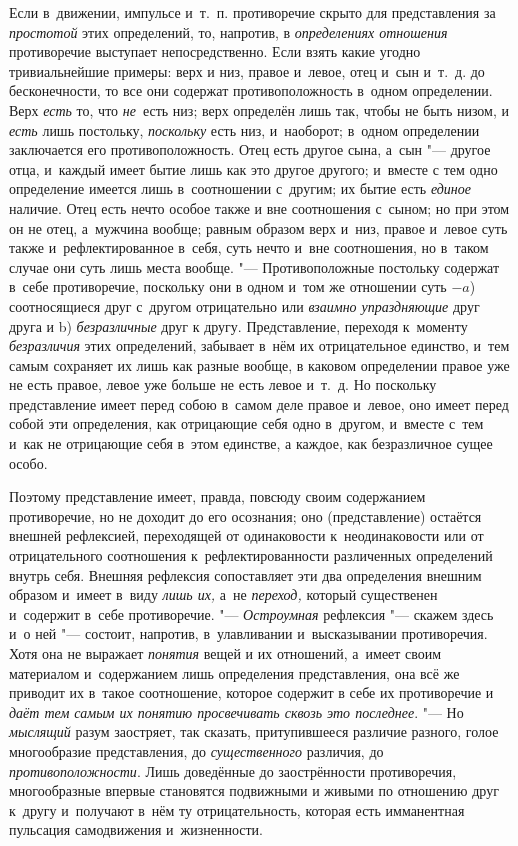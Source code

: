 Если в~движении, импульсе и~т.~п. противоречие скрыто для представления за
{\em простотой} этих определений, то, напротив, в
{\em определениях отношения} противоречие выступает
непосредственно. Если взять какие угодно тривиальнейшие примеры: верх и
низ, правое и~левое, отец и~сын и~т.~д. до бесконечности, то все они
содержат противоположность в~одном определении. Верх
{\em есть} то, что {\em не}~есть
низ; верх определён лишь так, чтобы не быть низом, и
{\em есть} лишь постольку, {\em поскольку} есть низ, и~наоборот; в~одном
определении заключается его противоположность. Отец есть другое сына, а~сын
"--- другое отца, и~каждый имеет бытие лишь как это другое другого; и~вместе с
тем одно определение имеется лишь в~соотношении с~другим; их бытие есть
{\em единое} наличие. Отец есть нечто особое также и
вне соотношения с~сыном; но при этом он не отец, а~мужчина вообще; равным
образом верх и~низ, правое и~левое суть также и~рефлектированное в~себя,
суть нечто и~вне соотношения, но в~таком случае они суть лишь места вообще.
"--- Противоположные постольку содержат в~себе противоречие, поскольку они в
одном и~том же отношении суть $-a$) соотносящиеся
друг с~другом отрицательно или {\em взаимно
упраздняющие} друг друга и b) {\em безразличные} друг к
другу. Представление, переходя к~моменту
{\em безразличия} этих определений, забывает в~нём их
отрицательное единство, и~тем самым сохраняет их лишь как разные вообще, в
каковом определении правое уже не есть правое, левое уже больше не есть
левое и~т.~д. Но поскольку представление имеет перед собою в~самом деле
правое и~левое, оно имеет перед собой эти определения, как отрицающие себя
одно в~другом, и~вместе с~тем и~как не отрицающие себя в~этом единстве, а
каждое, как безразличное сущее особо.

Поэтому представление имеет, правда, повсюду своим содержанием противоречие,
но не доходит до его осознания; оно (представление) остаётся внешней
рефлексией, переходящей от одинаковости к~неодинаковости или от
отрицательного соотношения к~рефлектированности различенных определений
внутрь себя. Внешняя рефлексия сопоставляет эти два определения внешним
образом и~имеет в~виду {\em лишь их,} а~не
{\em переход,} который существенен и~содержит в~себе
противоречие. "--- {\em Остроумная} рефлексия "--- скажем
здесь и~о ней "--- состоит, напротив, в~улавливании и~высказывании
противоречия. Хотя она не выражает {\em понятия} вещей
и их отношений, а~имеет своим материалом и~содержанием лишь определения
представления, она всё же приводит их в~такое соотношение, которое содержит
в себе их противоречие и {\em даёт тем самым их понятию
просвечивать сквозь это последнее}. "--- Но {\em мыслящий}
разум заостряет, так сказать, притупившееся различие разного, голое
многообразие представления, до {\em существенного}
различия, до {\em противоположности}. Лишь доведённые
до заострённости противоречия, многообразные впервые становятся подвижными
и живыми по отношению друг к~другу и~получают в~нём ту отрицательность,
которая есть имманентная пульсация самодвижения и~жизненности.

